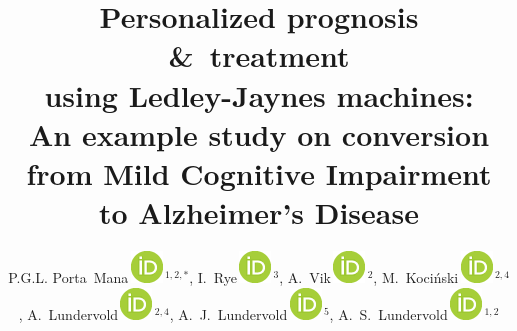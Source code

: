 \documentclass[utf8]{FrontiersinHarvard_mod} %
\providecommand{\href}[2]{#2}
\newcommand*{\amp}{\&}
\renewcommand*{\|}[1][]{\nonscript\:#1\vert\nonscript\:\mathopen{}}
\newcommand*{\ljm}{Ledley-Jaynes machine}
\def\firstAuthorLast{Porta~Mana {et~al.}} %
\def\Authors{P.G.L. Porta~Mana\,\href{https://orcid.org/0000-0002-6070-0784}{\protect\includegraphics[scale=0.25]{orcid_32x32.png}}\,$^{1,2,*}$,
  I.~Rye\,\href{https://orcid.org/0000-0003-4822-9480}{\protect\includegraphics[scale=0.25]{orcid_32x32.png}}\,$^{3}$,
  A.~Vik\,\href{https://orcid.org/0000-0003-0374-9327}{\protect\includegraphics[scale=0.25]{orcid_32x32.png}}\,$^{2}$,
  M.~Koci\'nski\,\href{https://orcid.org/0000-0001-7088-4823}{\protect\includegraphics[scale=0.25]{orcid_32x32.png}}\,$^{2,4}$,
  A.~Lundervold\,\href{https://orcid.org/0000-0002-6819-6164}{\protect\includegraphics[scale=0.25]{orcid_32x32.png}}\,$^{2,4}$,
  A.~J.~Lundervold\,\href{https://orcid.org/0000-0001-8663-4247}{\protect\includegraphics[scale=0.25]{orcid_32x32.png}}\,$^{5}$,
  A.~S.~Lundervold\,\href{https://orcid.org/0000-0001-8663-4247}{\protect\includegraphics[scale=0.25]{orcid_32x32.png}}\,$^{1,2}$}
\begin{document}
\onecolumn
{}

\title[Personalized prognosis \amp\ treatment using a \ljm]{Personalized prognosis \amp\ treatment\\ using Ledley-Jaynes machines:\\ An example study on  conversion from Mild Cognitive Impairment to Alzheimer's Disease} 

\author[\firstAuthorLast ]{\Authors} %
\address{} %
\correspondance{} %

\extraAuth{}%


\maketitle
\end{document}
